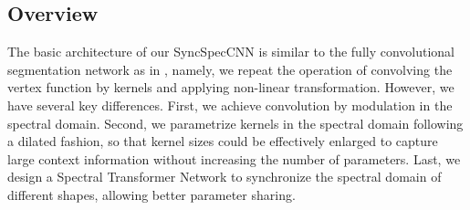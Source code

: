 \subsection{Overview}
The basic architecture of our SyncSpecCNN is similar to the fully convolutional segmentation network as in \cite{long2015fully}, namely, we repeat the operation of convolving the vertex function by kernels and applying non-linear transformation. However, we have several key differences. First, we achieve convolution by modulation in the spectral domain.
Second, we parametrize kernels in the spectral domain following a dilated fashion, so that kernel sizes could be effectively enlarged to capture large context information without increasing the number of parameters.
Last, we design a Spectral Transformer Network to synchronize the spectral domain of different shapes, allowing better parameter sharing.
\iffalse
